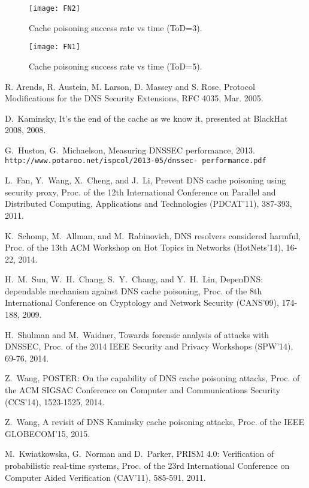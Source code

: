 \documentclass[conference]{IEEEtran}
\begin{document}
\begin{figure}[!t]
\begin{minipage}[t]{0.48\linewidth}
\centering
\texttt{[image: FN2]}
\vspace{-0.5em}
\caption{Cache poisoning success rate vs time (ToD=3).}
\vspace{-2em}
\end{minipage}
\hspace{0.3cm}
\begin{minipage}[t]{0.48\linewidth}
\centering
\texttt{[image: FN1]}
\vspace{-0.5em}
\caption{Cache poisoning success rate vs time (ToD=5).}
\vspace{-2em}
\end{minipage}
\end{figure}

\begin{thebibliography}{1}


R. Arends, R. Austein, M. Larson, D. Massey and S. Rose, Protocol Modifications for the DNS Security Extensions, RFC 4035, Mar. 2005.

D.~Kaminsky, It's the end of the cache as we know it, presented at BlackHat 2008, 2008.

G.~Huston, G.~Michaelson, Measuring DNSSEC performance, 2013. \texttt{http://www.potaroo.net/ispcol/2013-05/dnssec- performance.pdf}

L.~Fan, Y.~Wang, X.~Cheng, and J.~Li, Prevent DNS cache poisoning using security proxy, Proc. of the 12th International Conference on Parallel and Distributed Computing, Applications and Technologies (PDCAT'11), 387-393, 2011.

K.~Schomp, M.~Allman, and M.~Rabinovich, DNS resolvers considered harmful, Proc. of the 13th ACM Workshop on Hot Topics in Networks (HotNets'14), 16-22, 2014.

H.~M.~Sun, W.~H.~Chang, S.~Y.~Chang, and Y.~H.~Lin, DepenDNS: dependable mechanism against DNS cache poisoning, Proc. of the 8th International Conference on Cryptology and Network Security (CANS'09), 174-188, 2009.

H.~Shulman and M.~Waidner, Towards forensic analysis of attacks with DNSSEC, Proc. of the 2014 IEEE Security and Privacy Workshops (SPW'14), 69-76, 2014.

Z.~Wang, POSTER: On the capability of DNS cache poisoning attacks, Proc. of the ACM SIGSAC Conference on Computer and Communications Security (CCS'14), 1523-1525, 2014.

Z.~Wang, A revisit of DNS Kaminsky cache poisoning attacks, Proc. of the IEEE GLOBECOM'15, 2015.

M.~Kwiatkowska, G.~Norman and D.~Parker, PRISM 4.0: Verification of probabilistic real-time systems, Proc. of the 23rd International Conference on Computer Aided Verification (CAV'11), 585-591, 2011.
\end{thebibliography}
\end{document}
